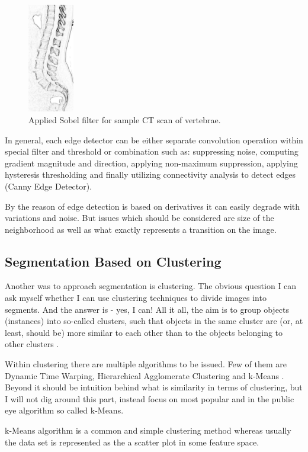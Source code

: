\begin{figure}[h] 
\centering
\includegraphics[width=2cm]{images/sample_vertebrae_sobel.jpeg}
    \caption {Applied Sobel filter for sample CT scan of vertebrae.}
    \label{fig:sobel}
\end{figure}

In general, each edge detector can be either separate convolution operation within special filter and threshold or combination such as: suppressing noise, computing gradient magnitude and direction, applying non-maximum suppression, applying hysteresis thresholding and finally utilizing connectivity analysis to detect edges (Canny Edge Detector).

By the reason of edge detection is based on derivatives it can easily degrade with variations and noise. But issues which should be considered are size of the neighborhood as well as what exactly represents a transition on the image. 

\subsection{Segmentation Based on Clustering}
Another was to approach segmentation is clustering. The obvious question I can ask myself whether I can use clustering techniques to divide images into segments. And the answer is - yes, I can! All it all, the aim is to group objects (instances) into so-called clusters, such that objects in the same cluster are (or, at least, should be) more similar to each other than to the objects belonging to other clusters \cite{Dhanachandra2017}. 

Within clustering there are multiple algorithms to be issued. Few of them are 
Dynamic Time Warping, Hierarchical Agglomerate Clustering and k-Means \cite{Dhanachandra2017}. Beyond it should be intuition behind what is similarity in terms of clustering, but I will not dig around this part, instead focus on most popular and in the public eye algorithm so called k-Means.  

k-Means algorithm is a common and simple clustering method whereas usually the data set is represented as the a scatter plot in some feature space.

